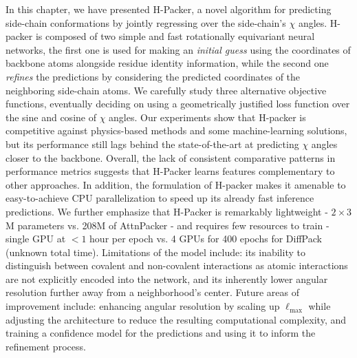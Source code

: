 In this chapter, we have presented H-Packer, a novel algorithm for predicting side-chain conformations by jointly
regressing over the side-chain's $\chi$ angles. H-packer is composed of two simple and fast rotationally equivariant
neural networks, the first one is used for making an \textit{initial guess} using the coordinates of backbone atoms
alongside residue identity information, while the second one \textit{refines} the predictions by considering the
predicted coordinates of the neighboring side-chain atoms. We carefully study three alternative objective functions,
eventually deciding on using a geometrically justified loss function over the sine and cosine of $\chi$ angles. Our
experiments show that H-packer is competitive against physics-based methods and some machine-learning solutions, but its
performance still lags behind the state-of-the-art at predicting $\chi$ angles closer to the backbone. Overall, the lack
of consistent comparative patterns in performance metrics suggests that H-Packer learns features complementary to other
approaches. In addition, the formulation of H-packer makes it amenable to easy-to-achieve CPU parallelization to speed
up its already fast inference predictions.
We further emphasize that H-Packer is remarkably lightweight - $2\times 3$M parameters vs. 208M of AttnPacker - and
requires few resources to train - single GPU at $< 1$ hour per epoch vs. 4 GPUs for 400 epochs for DiffPack (unknown
total time).
Limitations of the model include: its inability to distinguish between covalent and non-covalent interactions as atomic
interactions are not explicitly encoded into the network, and its inherently lower angular resolution further away from
a neighborhood's center. Future areas of improvement include: enhancing angular resolution by scaling up
$\ell_{\text{max}}$ while adjusting the architecture to reduce the resulting computational complexity, and training a
confidence model for the predictions and using it to inform the refinement process.


